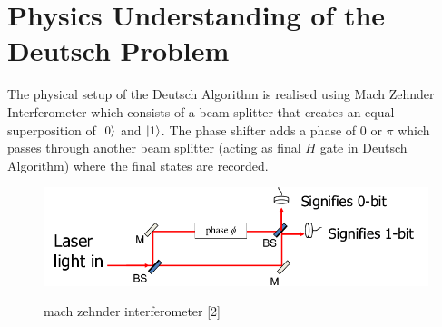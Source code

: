 \documentclass[11.5pt, paper=a4]{article}
\theoremstyle{definition}
\numberwithin{theorem}{section}
\begin{document}
\section{Physics Understanding of the Deutsch Problem}

The physical setup of the Deutsch Algorithm is realised using Mach Zehnder Interferometer which consists of a beam splitter that creates an equal superposition of $\left\vert{0}\right\rangle$ and $\left\vert{1}\right\rangle$. The phase shifter adds a phase of $0$ or $\pi$ which passes through another beam splitter (acting as final $H$ gate in Deutsch Algorithm) where the final states are recorded. 

\begin{figure}[H]
    \centering
    \includegraphics[scale=0.5]{mz.png}\\
    \caption{mach zehnder interferometer [2]}
    \label{fig : mach zehnder interferometer}
\end{figure}



\nocite{*}


\end{document}
